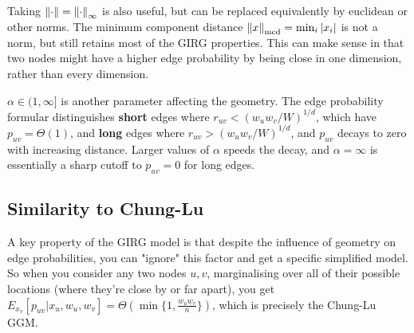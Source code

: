Taking $\left\lVert \cdot\right\rVert = \left\lVert \cdot\right\rVert_\infty$ is also useful, but can be replaced equivalently by euclidean or other norms. The minimum component distance $\left\lVert x\right\rVert_{\mathrm{mcd}} = \min_i |x_i|$ is not a norm, but still retains most of the GIRG properties. This can make sense in that two nodes might have a higher edge probability by being close in one dimension, rather than every dimension.

$\alpha \in (1, \infty]$ is another parameter affecting the geometry. The edge probability formular distinguishes \textbf{short} edges where $r_{uv} < (w_u w_v / W)^{1/d}$, which have $p_{uv} = \Theta(1)$, and \textbf{long} edges where $r_{uv} > (w_u w_v / W)^{1/d}$, and $p_{uv}$ decays to zero with increasing distance. Larger values of $\alpha$ speeds the decay, and $\alpha=\infty$ is essentially a sharp cutoff to $p_{uv} = 0$ for long edges.


\subsection{Similarity to Chung-Lu} A key property of the GIRG model is that despite the influence of geometry on edge probabilities, you can "ignore" this factor and get a specific simplified model. So when you consider any two nodes $u,v$, marginalising over all of their possible locations (where they're close by or far apart), you get $E_{x_v}[p_{uv} | x_u, w_u, w_v] = \Theta(\min\{1, \frac{w_u w_v}{n} \})$, which is precisely the Chung-Lu GGM.

